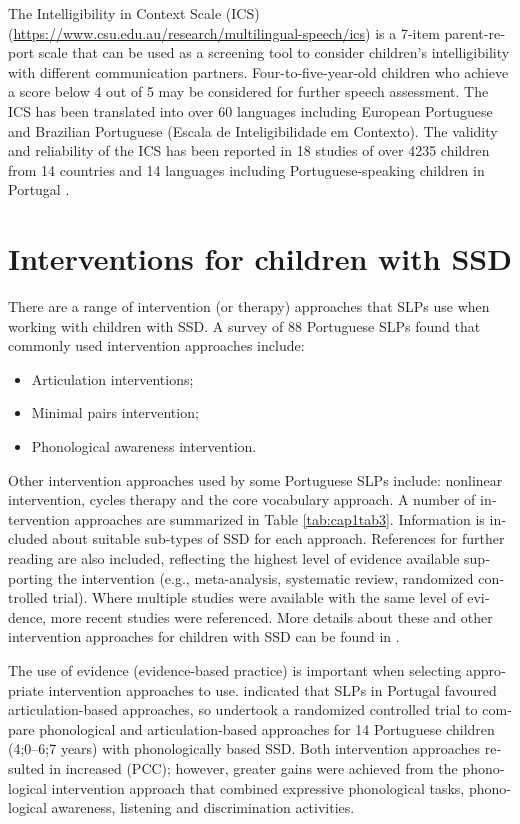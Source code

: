 \documentclass[output=paper,colorlinks,citecolor=brown]{langscibook}
\begin{document}
\begin{otherlanguage}{english}
The Intelligibility in Context Scale (ICS) (\url{https://www.csu.edu.au/research/multilingual-speech/ics}) is a 7-item parent-report scale that can be used as a screening tool to consider children’s intelligibility with different communication partners. Four-to-five-year-old children who achieve a score below 4 out of 5 may be considered for further speech assessment. The ICS has been translated into over 60 languages including European Portuguese and Brazilian Portuguese (Escala de Inteligibilidade em Contexto). The validity and reliability of the ICS has been reported in 18 studies of over 4235 children from 14 countries and 14 languages \citep{McLeod2020} including Portuguese-speaking children in Portugal \citep{Lousada2019}.


\section{Interventions for children with SSD}
\largerpage[2]
There are a range of intervention (or therapy) approaches that SLPs use when working with children with SSD. A survey of 88 Portuguese SLPs \citep{Oliveira2015} found that commonly used intervention approaches include: 


\begin{itemize}
    \item Articulation interventions; 
\item	Minimal pairs intervention;
\item	Phonological awareness intervention.
\end{itemize}


Other intervention approaches used by some Portuguese SLPs include: nonlinear intervention, cycles therapy and the core vocabulary approach. A number of intervention approaches are summarized in Table \ref{tab:cap1tab3}. Information is included about suitable sub-types of SSD for each approach. References for further reading are also included, reflecting the highest level of evidence available supporting the intervention (e.g., meta-analysis, systematic review, randomized controlled trial). Where multiple studies were available with the same level of evidence, more recent studies were referenced. More details about these and other intervention approaches for children with SSD can be found in \citep{Williams2021}.

The use of evidence (evidence-based practice) is important when selecting appropriate intervention approaches to use. \citet{Lousada2013} indicated that SLPs in Portugal favoured articulation-based approaches, so undertook a randomized controlled trial to compare phonological and articulation-based ap\-proa\-ches for 14 Portuguese children (4;0–6;7 years) with phonologically based SSD. Both intervention approaches resulted in increased (PCC); however, greater gains were achieved from the phonological intervention approach that combined expressive phonological tasks, phonological awareness, listening and discrimination activities.


\end{otherlanguage}
\end{document}

